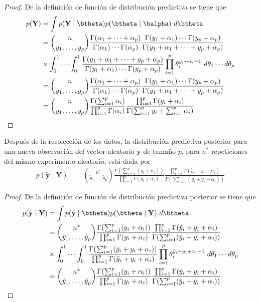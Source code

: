 \documentclass[10pt,openright]{book}\usepackage[]{graphicx}\usepackage[]{color}
\begin{document}
\begin{proof}
De la definici\'on de funci\'on de distribuci\'on predictiva se tiene que
\begin{align*}
p(\mathbf{Y})&=\int p(\mathbf{Y} \mid \btheta)p(\btheta \mid \balpha)\ d\btheta\\
&=\binom{n}{y_1,\ldots,y_p} \frac{\Gamma(\alpha_1+\cdots+\alpha_p)}{\Gamma(\alpha_1)\cdots\Gamma(\alpha_p)}
\frac{\Gamma(y_1+\alpha_1)\cdots\Gamma(y_p+\alpha_p)}{\Gamma(y_1+\alpha_1+\cdots + y_p+\alpha_p)}\\
&\times
\int_0^1 \cdots \int_0^1 \frac{\Gamma(y_1+\alpha_1+\cdots+y_p+\alpha_p)}{\Gamma(y_1+\alpha_1)\cdots\Gamma(y_p+\alpha_p)}
\prod_{i=1}^p\theta_i^{y_i+\alpha_i-1} \ d\theta_1 \cdots d\theta_p\\
&=\binom{n}{y_1,\ldots,y_p} \frac{\Gamma(\alpha_1+\cdots+\alpha_p)}{\Gamma(\alpha_1)\cdots\Gamma(\alpha_p)}
\frac{\Gamma(y_1+\alpha_1)\cdots\Gamma(y_p+\alpha_p)}{\Gamma(y_1+\alpha_1+\cdots + y_p+\alpha_p)}\\
&=\binom{n}{y_1,\ldots,y_p} \frac{\Gamma(\sum_{i=1}^p\alpha_i)}{\prod_{i=1}^p\Gamma(\alpha_i)}
\frac{\prod_{i=1}^p\Gamma(y_i+\alpha_i)}{\Gamma(\sum_{i=1}^py_i+\sum_{i=1}^p\alpha_i)}
\end{align*}
\end{proof}

\begin{Res}
Despu\'es de la recolecci\'on de los datos, la distribuci\'on predictiva posterior para una nueva observaci\'on del vector aleatorio $\tilde{\mathbf{y}}$ de tama\~no $p$, para $n^*$ repeticiones del mismo experimento aleatorio, est\'a dada por
\begin{align}
p(\tilde{\mathbf{y}} \mid \mathbf{Y})&=
  \binom{n^*}{\tilde{y}_1,\ldots,\tilde{y}_p} \frac{\Gamma(\sum_{i=1}^p(y_i+\alpha_i))}{\prod_{i=1}^p\Gamma(y_i+\alpha_i)}
\frac{\prod_{i=1}^p\Gamma(\tilde{y}_i+y_i+\alpha_i)}{\Gamma(\sum_{i=1}^p(\tilde{y}_i+y_i+\alpha_i))}
\end{align}
\end{Res}

\begin{proof}
De la definici\'on de funci\'on de distribuci\'on predictiva posterior se tiene que
\begin{align*}
p(\tilde{\mathbf{y}} \mid \mathbf{Y})&=\int p(\tilde{\mathbf{y}} \mid \btheta)p(\btheta \mid \mathbf{Y})\ d\btheta\\
&=\binom{n^*}{\tilde{y}_1,\ldots,\tilde{y}_p} \frac{\Gamma(\sum_{i=1}^p(y_i+\alpha_i))}{\prod_{i=1}^p\Gamma(y_i+\alpha_i)}
\frac{\prod_{i=1}^p\Gamma(\tilde{y}_i+y_i+\alpha_i)}{\Gamma(\sum_{i=1}^p(\tilde{y}_i+y_i+\alpha_i))}\\
&\times
\int_0^1 \cdots \int_0^1 \frac{\Gamma(\sum_{i=1}^p(\tilde{y}_i+y_i+\alpha_i))}{\prod_{i=1}^p\Gamma(\tilde{y}_i+y_i+\alpha_i)}
\prod_{i=1}^p\theta_i^{\tilde{y}_i+y_i+\alpha_i-1} \ d\theta_1 \cdots d\theta_p\\
&=\binom{n^*}{\tilde{y}_1,\ldots,\tilde{y}_p} \frac{\Gamma(\sum_{i=1}^p(y_i+\alpha_i))}{\prod_{i=1}^p\Gamma(y_i+\alpha_i)}
\frac{\prod_{i=1}^p\Gamma(\tilde{y}_i+y_i+\alpha_i)}{\Gamma(\sum_{i=1}^p(\tilde{y}_i+y_i+\alpha_i))}
\end{align*}
\end{proof}
\end{document}
